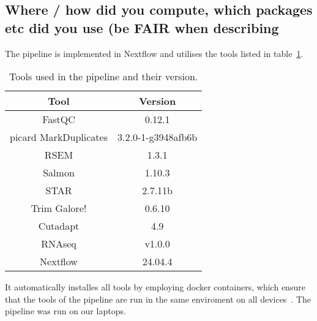 \documentclass{article}
\theoremstyle{plain}
\theoremstyle{definition}
\theoremstyle{remark}
\begin{document}
\subsection{Where / how did you compute, which packages etc did you use (be FAIR when describing}
The pipeline is implemented in Nextflow and utilises the tools listed in table~\ref{table:1}.
\begin{table}[h]
    \centering
    \caption{Tools used in the pipeline and their version.}
    \label{table:1}
    \begin{tabular}{||c c||}
        \hline
        Tool & Version \\
        \hline\hline
        FastQC & 0.12.1\\
        picard MarkDuplicates & 3.2.0-1-g3948afb6b\\
        RSEM & 1.3.1\\
        Salmon & 1.10.3\\
        STAR & 2.7.11b\\
        Trim Galore! & 0.6.10\\
        Cutadapt & 4.9\\
        RNAseq & v1.0.0\\
        Nextflow & 24.04.4\\
        \hline
    \end{tabular}
\end{table}
It automatically installes all tools by employing docker containers, which ensure that the tools of the pipeline are run in the same enviroment on all devices~\cite{docker}.  
The pipeline was run on our laptops.
\end{document}
